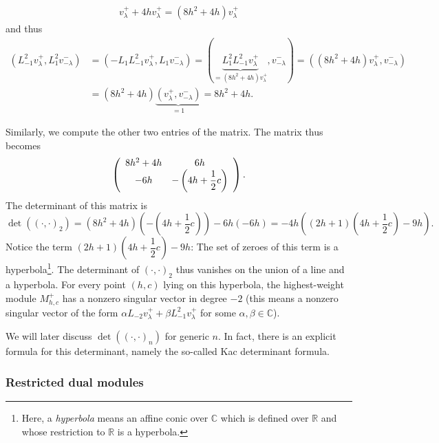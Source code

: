 \documentclass[etingof-lie.tex]{subfiles}
\begin{document}
\begin{example}
\begin{align*}
v_{\lambda}^{+}+4hv_{\lambda}^{+}=\left(  8h^{2}+4h\right)  v_{\lambda}^{+}%
\end{align*}
and thus%
\begin{align*}
\left(  L_{-1}^{2}v_{\lambda}^{+},L_{1}^{2}v_{-\lambda}^{-}\right)   &
=\left(  -L_{1}L_{-1}^{2}v_{\lambda}^{+},L_{1}v_{-\lambda}^{-}\right)
=\left(  \underbrace{L_{1}^{2}L_{-1}^{2}v_{\lambda}^{+}}_{=\left(
8h^{2}+4h\right)  v_{\lambda}^{+}},v_{-\lambda}^{-}\right)  =\left(  \left(
8h^{2}+4h\right)  v_{\lambda}^{+},v_{-\lambda}^{-}\right) \\
&  =\left(  8h^{2}+4h\right)  \underbrace{\left(  v_{\lambda}^{+},v_{-\lambda
}^{-}\right)  }_{=1}=8h^{2}+4h.
\end{align*}


Similarly, we compute the other two entries of the matrix. The matrix thus
becomes%
\[
\left(
\begin{array}
[c]{cc}%
8h^{2}+4h & 6h\\
-6h & -\left(  4h+\dfrac{1}{2}c\right)
\end{array}
\right)  .
\]
The determinant of this matrix is%
\[
\det\left(  \left(  \cdot,\cdot\right)  _{2}\right)  =\left(  8h^{2}%
+4h\right)  \left(  -\left(  4h+\dfrac{1}{2}c\right)  \right)  -6h\left(
-6h\right)  =-4h\left(  \left(  2h+1\right)  \left(  4h+\dfrac{1}{2}c\right)
-9h\right)  .
\]
Notice the term $\left(  2h+1\right)  \left(  4h+\dfrac{1}{2}c\right)  -9h$:
The set of zeroes of this term is a hyperbola\footnote{Here, a
\textit{hyperbola} means an affine conic over $\mathbb{C}$ which is defined
over $\mathbb{R}$ and whose restriction to $\mathbb{R}$ is a hyperbola.}. The
determinant of $\left(  \cdot,\cdot\right)  _{2}$ thus vanishes on the union
of a line and a hyperbola. For every point $\left(  h,c\right)  $ lying on
this hyperbola, the highest-weight module $M_{h,c}^{+}$ has a nonzero singular
vector in degree $-2$ (this means a nonzero singular vector of the form
$\alpha L_{-2}v_{\lambda}^{+}+\beta L_{-1}^{2}v_{\lambda}^{+}$ for some
$\alpha,\beta\in\mathbb{C}$).

We will later discuss $\det\left(  \left(  \cdot,\cdot\right)  _{n}\right)  $
for generic $n$. In fact, there is an explicit formula for this determinant,
namely the so-called Kac determinant formula.
\end{example}

\subsubsection{Restricted dual modules}
\end{document}
